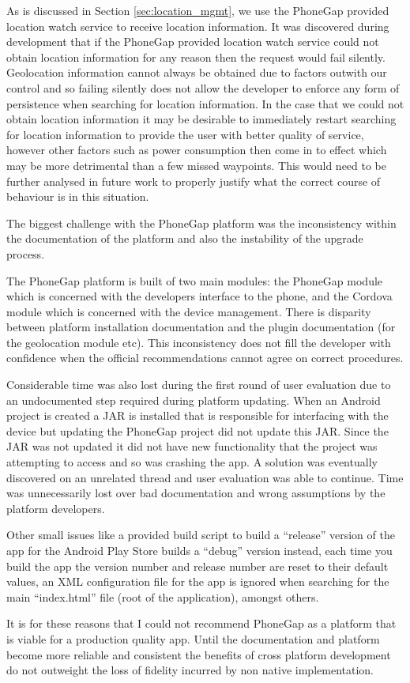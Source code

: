 As is discussed in Section \ref{sec:location_mgmt}, we use the PhoneGap
provided location watch service to receive location information. It
was discovered during development that if the PhoneGap provided
location watch service could not obtain location information for any
reason then the request would fail silently. Geolocation information
cannot always be obtained due to factors outwith our control and so
failing silently does not allow the developer to enforce any form of
persistence when searching for location information. In the case that
we could not obtain location information it may be desirable to
immediately restart searching for location information to provide the
user with better quality of service, however other factors such as
power consumption then come in to effect which may be more detrimental
than a few missed waypoints. This would need to be further analysed in
future work to properly justify what the correct course of behaviour
is in this situation.

The biggest challenge with the PhoneGap platform was the inconsistency
within the documentation of the platform and also the instability of
the upgrade process. 

The PhoneGap platform is built of two main modules: the PhoneGap
module which is concerned with the developers interface to the phone,
and the Cordova module which is concerned with the device management.
There is disparity between platform installation documentation and the
plugin documentation (for the geolocation module
etc)\cite{phonegap_install, phonegap_cli,
  phonegap_geolocationAccessingFeature}. This inconsistency does not
fill the developer with confidence when the official recommendations
cannot agree on correct procedures. 

Considerable time was also lost during the first round of user
evaluation due to an undocumented step required during platform
updating. When an Android project is created a JAR is installed that
is responsible for interfacing with the device but updating the
PhoneGap project did not update this JAR. Since the JAR was not
updated it did not have new functionality that the project was
attempting to access and so was crashing the app. A solution was
eventually discovered on an unrelated thread\cite{pluginFix} and user
evaluation was able to continue. Time was unnecessarily lost over bad
documentation and wrong assumptions by the platform developers.

Other small issues like a provided build script to build a ``release''
version of the app for the Android Play Store builds a ``debug''
version instead, each time you build the app the version number and
release number are reset to their default values, an XML configuration
file for the app is ignored when searching for the main ``index.html''
file (root of the application), amongst others.

It is for these reasons that I could not recommend PhoneGap as a
platform that is viable for a production quality app. Until the
documentation and platform become more reliable and consistent the
benefits of cross platform development do not outweight the loss of
fidelity incurred by non native implementation.
